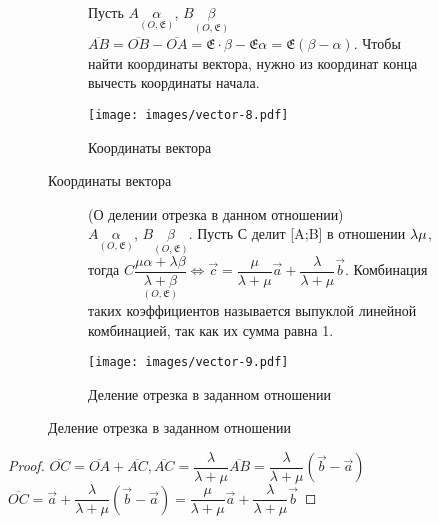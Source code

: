 \vspace{3mm}
 \begin{figure}[h]
	\begin{subfigure}[t!]{0.6\linewidth}
		\begin{proposition}
			Пусть \(A\underset{(O, \mathfrak{E})}{\alpha}\), \(B\underset{(O, \mathfrak{E})}{\beta}\) \\
			$\overline{AB} = \overline{OB} - \overline{OA} = \mathfrak{E}\cdot \beta - \mathfrak{E}\alpha = \mathfrak{E}(\beta - \alpha)$. Чтобы найти координаты вектора, нужно из координат конца вычесть координаты начала.
		\end{proposition}
	\end{subfigure}
	\begin{subfigure}[b!]{0.4\linewidth}
		\centering
		\texttt{[image: images/vector-8.pdf]}
		\caption*{Координаты вектора}
		\label{Vector8}
	\end{subfigure}
\end{figure}
\begin{figure}[h]
	\begin{subfigure}[t!]{0.6\linewidth}
		\begin{proposition}
			(О делении отрезка в данном отношении) \\
			\(A\underset{(O, \mathfrak{E})}{\alpha}\), \(B\underset{(O, \mathfrak{E})}{\beta}\). Пусть С делит [A;B] в отношении \(\lambda \\ \mu\), тогда \(C\underset{(O,\mathfrak{E})}{\dfrac{\mu\alpha+\lambda\beta}{\lambda + \beta}}\Longleftrightarrow \vec{c} = \dfrac{\mu}{\lambda+\mu}\vec{a}+\dfrac{\lambda}{\lambda+\mu}\vec{b}\). Комбинация таких коэффициентов называется выпуклой линейной комбинацией, так как их сумма равна 1.
		\end{proposition}
	\end{subfigure}
	\begin{subfigure}[b!]{0.4\linewidth}
		\centering
		\texttt{[image: images/vector-9.pdf]}
		\caption*{Деление отрезка в заданном отношении}
		\label{Vector9}
	\end{subfigure}
\end{figure}
\begin{proof}
	$\overline{OC} = \overline{OA}+\overline{AC}, \overline{AC} = \dfrac{\lambda}{\lambda+\mu}\overline{AB}=\dfrac{\lambda}{\lambda+\mu}(\vec{b} - \vec{a})$
	\(\overline{OC} = \vec{a}+\dfrac{\lambda}{\lambda+\mu}(\vec{b} - \vec{a}) = \dfrac{\mu}{\lambda+\mu}\vec{a} + \dfrac{\lambda}{\lambda+\mu}\vec{b}\)
\end{proof}
